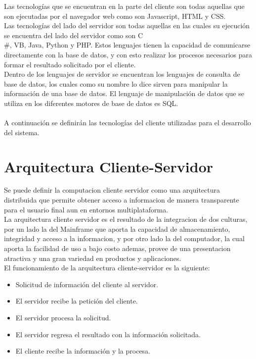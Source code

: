 Las tecnolog\'ias que se encuentran en la parte del cliente son todas aquellas que son ejecutadas por el navegador web como son Javascript, HTML y CSS.\\

Las tecnolog\'ias del lado del servidor son todas aquellas en las cuales su ejecuci\'on se encuentra del lado del servidor como son C\\#, VB, Java, Python y PHP. Estos lenguajes tienen la capacidad de comunicarse directamente con la base de datos, y con esto realizar los procesos necesarios para formar el resultado solicitado por el cliente.\\ 	

Dentro de los lenguajes de servidor se encuentran los lenguajes de consulta de base de datos, los cuales como su nombre lo dice sirven para manipular la informaci\'on de una base de datos. El lenguaje de manipulaci\'on de datos que se utiliza en los diferentes motores de base de datos es SQL.\\ \\
A continuaci\'on se definir\'an las tecnolog\'ias del cliente utilizadas para el desarrollo del sistema.
\section{Arquitectura Cliente-Servidor}

Se puede definir la computacion cliente servidor  como una arquitectura  distribuida que permite obtener acceso a informacion de manera transparente para el usuario final aun en entornos multiplataforma.\\

La arquitectura cliente servidor es el resultado de la integracion de dos culturas, por un lado la del Mainframe que aporta la capacidad de almacenamiento, integridad y acceso a la informacion, y por otro lado la del computador, la cual aporta la facilidad de uso a bajo costo ademas, provee de una presentacion atractiva y una gran variedad en productos y aplicaciones.\\

El funcionamiento de la arquitectura cliente-servidor es la siguiente:

\begin{itemize}
	\item Solicitud de informaci\'on del cliente al servidor.
	\item El servidor recibe la petici\'on del cliente.
	\item El servidor procesa la solicitud.
	\item El servidor regresa el resultado con la informaci\'on solicitada.
	\item El cliente recibe la informaci\'on y la procesa.
\end{itemize}

